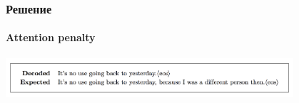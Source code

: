 \documentclass[10pt]{beamer}
\begin{document}
\begin{frame}
\frametitle{Решение}
\framesubtitle{Attention penalty}


\begin{center}
    \vskip-2.5mm
    \includegraphics[width=0.8\textwidth]{images/bad_sample.png}
\end{center}


\end{frame}
\end{document}
